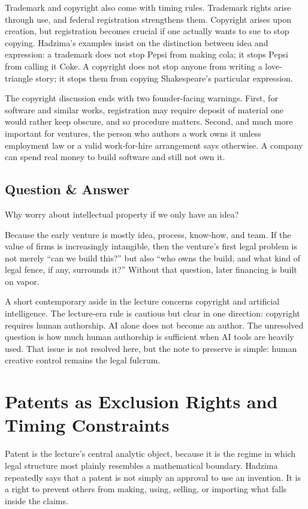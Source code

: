 Trademark and copyright also come with timing rules. Trademark rights arise through use, and federal registration strengthens them. Copyright arises upon creation, but registration becomes crucial if one actually wants to sue to stop copying. Hadzima's examples insist on the distinction between idea and expression: a trademark does not stop Pepsi from making cola; it stops Pepsi from calling it Coke. A copyright does not stop anyone from writing a love-triangle story; it stops them from copying Shakespeare's particular expression.

The copyright discussion ends with two founder-facing warnings. First, for software and similar works, registration may require deposit of material one would rather keep obscure, and so procedure matters. Second, and much more important for ventures, the person who authors a work owns it unless employment law or a valid work-for-hire arrangement says otherwise. A company can spend real money to build software and still not own it.

\subsection{Question \& Answer}

Why worry about intellectual property if we only have an idea?

Because the early venture is mostly idea, process, know-how, and team. If the value of firms is increasingly intangible, then the venture's first legal problem is not merely ``can we build this?'' but also ``who owns the build, and what kind of legal fence, if any, surrounds it?'' Without that question, later financing is built on vapor.

A short contemporary aside in the lecture concerns copyright and artificial intelligence. The lecture-era rule is cautious but clear in one direction: copyright requires human authorship. AI alone does not become an author. The unresolved question is how much human authorship is sufficient when AI tools are heavily used. That issue is not resolved here, but the note to preserve is simple: human creative control remains the legal fulcrum.

\section{Patents as Exclusion Rights and Timing Constraints}

Patent is the lecture's central analytic object, because it is the regime in which legal structure most plainly resembles a mathematical boundary. Hadzima repeatedly says that a patent is not simply an approval to use an invention. It is a right to prevent others from making, using, selling, or importing what falls inside the claims.

